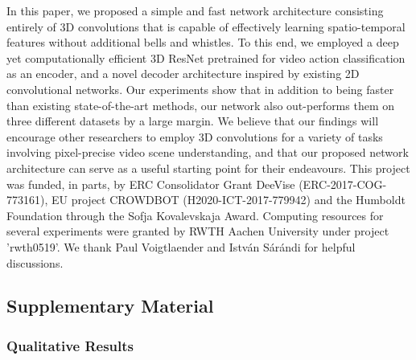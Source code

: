 \documentclass{bmvc2k_arxiv}
\newcommand{\PAR}[1]{\vskip4pt \noindent {\bf #1~}}
\begin{document}
In this paper, we proposed a simple and fast network architecture consisting entirely of 3D convolutions that is capable of effectively learning spatio-temporal features without additional bells and whistles. To this end, we employed a deep yet computationally efficient 3D ResNet pretrained for video action classification as an encoder, and a novel decoder architecture inspired by existing 2D convolutional networks. 
Our experiments show that in addition to being faster than existing state-of-the-art methods, our network also out-performs them on three different datasets by a large margin. 
We believe that our findings will encourage other researchers to employ 3D convolutions for a variety of tasks involving pixel-precise video scene understanding, and that our proposed network architecture can serve as a useful starting point for their endeavours. 
\PAR{Acknowledgements.}
This project was funded, in parts, by ERC Consolidator Grant DeeVise (ERC-2017-COG-773161), EU project CROWDBOT
(H2020-ICT-2017-779942) and the Humboldt Foundation through the Sofja Kovalevskaja
Award. Computing resources for several experiments were granted by RWTH Aachen University under project 'rwth0519'. We thank Paul Voigtlaender and Istv{\'a}n S{\'a}r{\'a}ndi for helpful discussions.

\clearpage


\clearpage
\appendix
\textcolor{bmv@sectioncolor}{\vspace{-1.2cm} \part*{Supplementary Material}}
\section{Qualitative Results}
\end{document}
